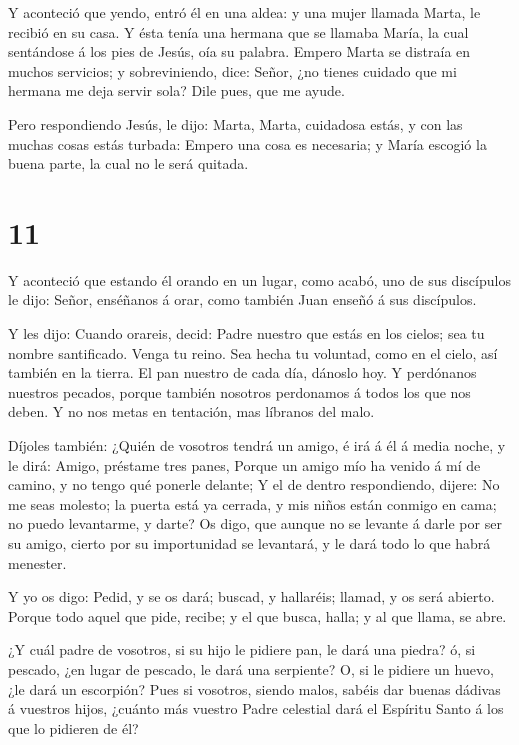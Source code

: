  Y aconteció que yendo, entró él en una aldea: y una mujer
llamada Marta, le recibió en su casa.  Y ésta tenía una
hermana que se llamaba María, la cual sentándose á los pies de Jesús,
oía su palabra.  Empero Marta se distraía en muchos
servicios; y sobreviniendo, dice: Señor, ¿no tienes cuidado que mi
hermana me deja servir sola? Dile pues, que me ayude.

 Pero respondiendo Jesús, le dijo: Marta, Marta, cuidadosa
estás, y con las muchas cosas estás turbada:  Empero una
cosa es necesaria; y María escogió la buena parte, la cual no le será
quitada.

\hypertarget{section-10}{%
\section{11}\label{section-10}}

 Y aconteció que estando él orando en un lugar, como acabó,
uno de sus discípulos le dijo: Señor, enséñanos á orar, como también
Juan enseñó á sus discípulos.

 Y les dijo: Cuando orareis, decid: Padre nuestro que estás
en los cielos; sea tu nombre santificado. Venga tu reino. Sea hecha tu
voluntad, como en el cielo, así también en la tierra.  El
pan nuestro de cada día, dánoslo hoy.  Y perdónanos nuestros
pecados, porque también nosotros perdonamos á todos los que nos deben. Y
no nos metas en tentación, mas líbranos del malo.

 Díjoles también: ¿Quién de vosotros tendrá un amigo, é irá
á él á media noche, y le dirá: Amigo, préstame tres panes, 
Porque un amigo mío ha venido á mí de camino, y no tengo qué ponerle
delante;  Y el de dentro respondiendo, dijere: No me seas
molesto; la puerta está ya cerrada, y mis niños están conmigo en cama;
no puedo levantarme, y darte?  Os digo, que aunque no se
levante á darle por ser su amigo, cierto por su importunidad se
levantará, y le dará todo lo que habrá menester.

 Y yo os digo: Pedid, y se os dará; buscad, y hallaréis;
llamad, y os será abierto.  Porque todo aquel que pide,
recibe; y el que busca, halla; y al que llama, se abre.

 ¿Y cuál padre de vosotros, si su hijo le pidiere pan, le
dará una piedra? ó, si pescado, ¿en lugar de pescado, le dará una
serpiente?  O, si le pidiere un huevo, ¿le dará un
escorpión?  Pues si vosotros, siendo malos, sabéis dar
buenas dádivas á vuestros hijos, ¿cuánto más vuestro Padre celestial
dará el Espíritu Santo á los que lo pidieren de él?

